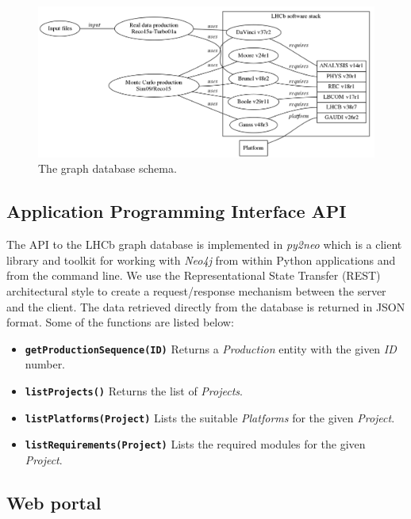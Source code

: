     \begin{figure}[h]
    \centering
    \includegraphics[width=\textwidth]{img/dbstruct}
    \caption{The graph database schema. }
    \label{fig:str}
    \end{figure}
    


\subsection{Application Programming Interface API}

The API to the LHCb graph database is implemented in \emph{py2neo} which is a client library and toolkit for working with \emph{Neo4j} from within Python applications and from the command line. We use the Representational State Transfer (REST)~\cite{jakl2005representational} architectural style to create a request/response mechanism between the server and the client. The data retrieved directly from the database is returned in JSON format. Some of the functions are listed below:

\begin{itemize}
    \item {\bf{ \verb|getProductionSequence(ID)|}} Returns a \emph{Production} entity with the given \emph{ID} number.
    \item {\bf{ \verb|listProjects()|}} Returns the list of \emph{Projects}.
    \item {\bf{ \verb|listPlatforms(Project)|}} Lists the suitable \emph{Platforms} for the given \emph{Project}.
    \item {\bf{ \verb|listRequirements(Project)|}} Lists the required modules for the given \emph{Project}.
\end{itemize}

\subsection{Web portal}

